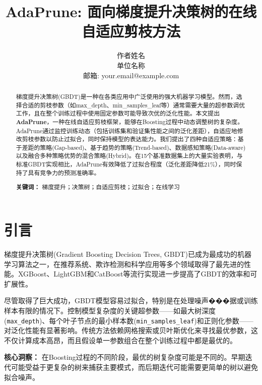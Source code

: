 \documentclass[12pt,a4paper]{article}
\title{\textbf{AdaPrune: 面向梯度提升决策树的在线自适应剪枝方法}}
\author{
作者姓名\\
单位名称\\
邮箱:  your.email@example.com
}
\date{}
\begin{document}
\maketitle

\begin{abstract}

梯度提升决策树(GBDT)是一种在各类应用中广泛使用的强大机器学习模型。然而，选择合适的剪枝参数（如max\_depth、min\_samples\_leaf等）通常需要大量的超参数调优工作，且在整个训练过程中使用固定参数可能导致次优的泛化性能。本文提出\textbf{AdaPrune}，一种在线自适应剪枝框架，能够在Boosting过程中动态调整树的复杂度。AdaPrune通过监控训练动态（包括训练集和验证集性能之间的泛化差距），自适应地修改剪枝参数以防止过拟合，同时保持模型的表达能力。我们提出了四种自适应策略：基于差距的策略(Gap-based)、基于趋势的策略(Trend-based)、数据感知策略(Data-aware)以及融合多种策略优势的混合策略(Hybrid)。在15个基准数据集上的大量实验表明，与标准GBDT实现相比，AdaPrune有效降低了过拟合程度（泛化差距降低21\%），同时保持了具有竞争力的预测准确率。

\textbf{关键词：} 梯度提升；决策树；自适应剪枝；过拟合；在线学习

\end{abstract}

\section{引言}

梯度提升决策树(Gradient Boosting Decision Trees, GBDT)\cite{friedman2001greedy}已成为最成功的机器学习算法之一，在推荐系统、欺诈检测和科学应用等多个领域取得了最先进的性能。XGBoost\cite{chen2016xgboost}、LightGBM\cite{ke2017lightgbm}和CatBoost\cite{prokhorenkova2018catboost}等流行实现进一步提高了GBDT的效率和可扩展性。

尽管取得了巨大成功，GBDT模型容易过拟合，特别是在处理噪声���据或训练样本有限的情况下。控制模型复杂度的关键超参数——如最大树深度(\texttt{max\_depth})、每个叶子节点的最小样本数(\texttt{min\_samples\_leaf})和正则化参数——对泛化性能有显著影响。传统方法依赖网格搜索或贝叶斯优化来寻找最优参数，这不仅计算成本高昂，而且假设单一参数组合在整个训练过程中都是最优的。

\textbf{核心洞察：} 在Boosting过程的不同阶段，最优的树复杂度可能是不同的。早期迭代可能受益于更复杂的树来捕获主要模式，而后期迭代可能需要更简单的树以避免拟合噪声。
\end{document}
